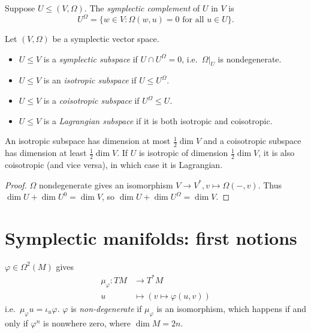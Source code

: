 \documentclass[a4paper]{article}
\begin{document}
\begin{definition}
  Suppose \(U \leq (V, \Omega)\). The \emph{symplectic complement} of \(U\) in \(V\) is
  \[
    U^{\Omega} = \{w \in V: \Omega(w, u) = 0 \text{ for all } u \in U\}.
  \]
\end{definition}

\begin{definition}
  Let \((V, \Omega)\) be a symplectic vector space.
  \begin{itemize}
  \item \(U \leq V\) is a \emph{symplectic subspace} if \(U \cap U^\Omega = 0\), i.e.\ \(\Omega|_U\) is nondegenerate.
  \item \(U \leq V\) is an \emph{isotropic subspace} if \(U \leq U^\Omega\).
  \item \(U \leq V\) is a \emph{coisotropic subspace} if \(U^\Omega \leq U\).
  \item \(U \leq V\) is a \emph{Lagrangian subspace} if it is both isotropic and coisotropic.
  \end{itemize}
\end{definition}

\begin{proposition}
  An isotropic subspace has dimension at most \(\frac{1}{2} \dim V\) and a coisotropic subspace has dimension at least \(\frac{1}{2} \dim V\). If \(U\) is isotropic of dimension \(\frac{1}{2} \dim V\), it is also coisotropic (and vice versa), in which case it is Lagrangian.
\end{proposition}

\begin{proof}
  \(\Omega\) nondegenerate gives an isomorphism \(V \to V^*, v \mapsto \Omega(-, v)\). Thus \(\dim U + \dim U^0 = \dim V\), so \(\dim U + \dim U^\Omega = \dim V\).
\end{proof}

\section{Symplectic manifolds: first notions}

\(\varphi \in \Omega^2(M)\) gives
\begin{align*}
  \mu_\varphi: TM &\to T^*M \\
  u &\mapsto (v \mapsto \varphi(u, v))
\end{align*}
i.e.\ \(\mu_\varphi u = \iota_u \varphi\). \(\varphi\) is \emph{non-degenerate} if \(\mu_\varphi\) is an isomorphism, which happens if and only if \(\varphi^n\) is nonwhere zero, where \(\dim M = 2n\).
\end{document}

